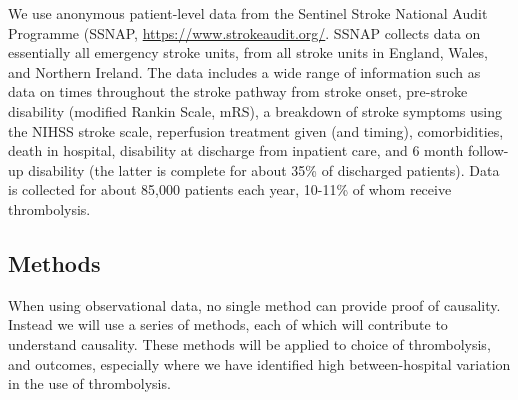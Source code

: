 We use anonymous patient-level data from the Sentinel Stroke National Audit Programme (SSNAP, \url{https://www.strokeaudit.org/}. SSNAP collects data on essentially all emergency stroke units, from all stroke units in England, Wales, and Northern Ireland. The data includes a wide range of information such as data on times throughout the stroke pathway from stroke onset, pre-stroke disability (modified Rankin Scale, mRS), a breakdown of stroke symptoms using the NIHSS stroke scale, reperfusion treatment given (and timing), comorbidities, death in hospital, disability at discharge from inpatient care, and 6 month follow-up disability (the latter is complete for about 35\% of discharged patients). Data is collected for about 85,000 patients each year, 10-11\% of whom receive thrombolysis.

\subsection{Methods}

When using observational data, no single method can provide proof of causality. Instead we will use a series of methods, each of which will contribute to understand causality. These methods will be applied to choice of thrombolysis, and outcomes, especially where we have identified high between-hospital variation in the use of thrombolysis. 

